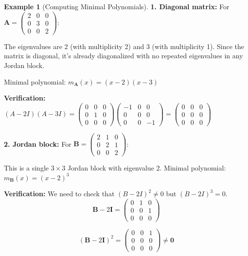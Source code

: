 \documentclass[12pt]{article}
\numberwithin{equation}{section}
\newcommand{\mat}[1]{\mathbf{#1}}        %
\theoremstyle{plain}
\theoremstyle{definition}
\newtheorem{example}[theorem]{Example}
\theoremstyle{remark}
\begin{document}
\begin{example}[Computing Minimal Polynomials]
\textbf{1. Diagonal matrix:}
For $\mat{A} = \begin{pmatrix} 2 & 0 & 0 \\ 0 & 3 & 0 \\ 0 & 0 & 2 \end{pmatrix}$:

The eigenvalues are 2 (with multiplicity 2) and 3 (with multiplicity 1). Since the matrix is diagonal, it's already diagonalized with no repeated eigenvalues in any Jordan block.

Minimal polynomial: $m_{\mat{A}}(x) = (x - 2)(x - 3)$

\textbf{Verification:} $(A - 2I)(A - 3I) = \begin{pmatrix} 0 & 0 & 0 \\ 0 & 1 & 0 \\ 0 & 0 & 0 \end{pmatrix}\begin{pmatrix} -1 & 0 & 0 \\ 0 & 0 & 0 \\ 0 & 0 & -1 \end{pmatrix} = \begin{pmatrix} 0 & 0 & 0 \\ 0 & 0 & 0 \\ 0 & 0 & 0 \end{pmatrix}$ \checkmark

\textbf{2. Jordan block:}
For $\mat{B} = \begin{pmatrix} 2 & 1 & 0 \\ 0 & 2 & 1 \\ 0 & 0 & 2 \end{pmatrix}$:

This is a single $3 \times 3$ Jordan block with eigenvalue 2.
Minimal polynomial: $m_{\mat{B}}(x) = (x - 2)^3$

\textbf{Verification:} We need to check that $(B - 2I)^2 \neq 0$ but $(B - 2I)^3 = 0$.
$$\mat{B} - 2\mat{I} = \begin{pmatrix} 0 & 1 & 0 \\ 0 & 0 & 1 \\ 0 & 0 & 0 \end{pmatrix}$$

$$(\mat{B} - 2\mat{I})^2 = \begin{pmatrix} 0 & 0 & 1 \\ 0 & 0 & 0 \\ 0 & 0 & 0 \end{pmatrix} \neq \mat{0}$$


\end{example}
\end{document}

